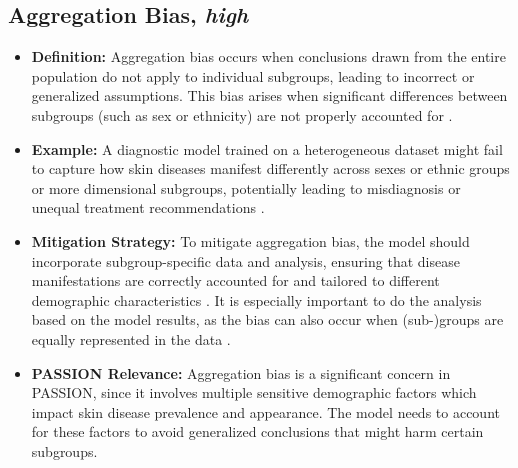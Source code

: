 \documentclass[12pt, a4paper, oneside]{book}   	%
\begin{document}
\begin{appendices}
		\subsection{Aggregation Bias, \textit{high}}
		\begin{itemize}
			\item \textbf{Definition:} Aggregation bias occurs when conclusions drawn from the entire population do not apply to individual subgroups, leading to incorrect or generalized assumptions. This bias arises when significant differences between subgroups (such as sex or ethnicity) are not properly accounted for \autocite{Mehrabi_2021,M144_Suresh_2021}.
			\item \textbf{Example:} A diagnostic model trained on a heterogeneous dataset might fail to capture how skin diseases manifest differently across sexes or ethnic groups or more dimensional subgroups, potentially leading to misdiagnosis or unequal treatment recommendations \autocite{M144_Suresh_2021, Mehrabi_2021}.
			\item \textbf{Mitigation Strategy:} To mitigate aggregation bias, the model should incorporate subgroup-specific data and analysis, ensuring that disease manifestations are correctly accounted for and tailored to different demographic characteristics \autocite{M144_Suresh_2021,Mehrabi_2021}. It is especially important to do the analysis based on the model results, as the bias can also occur when (sub-)groups are equally represented in the data \autocite{Mehrabi_2021}. 
			\item \textbf{PASSION Relevance:} Aggregation bias is a significant concern in PASSION, since it involves multiple sensitive demographic factors which impact skin disease prevalence and appearance. The model needs to account for these factors to avoid generalized conclusions that might harm certain subgroups.
		\end{itemize}
		

\end{appendices}
\end{document}
